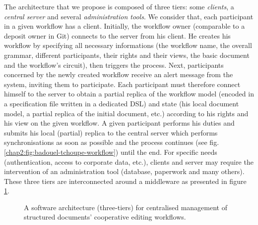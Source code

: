 \label{chap2:sec:archi-overall-operations}
The architecture that we propose is composed of three tiers: some \textit{clients}, a \textit{central server} and several \textit{administration tools}. We consider that, each participant in a given workflow has a client. Initially, the workflow owner (comparable to a deposit owner in Git) connects to the server from his client. He creates his workflow by specifying all necessary informations (the workflow name, the overall grammar, different participants, their rights and their views, the basic document and the workflow's circuit), then triggers the process. Next, participants concerned by the newly created workflow receive an alert message from the system, inviting them to participate. Each participant must therefore connect himself to the server to obtain a partial replica of the workflow model (encoded in a specification file written in a dedicated DSL) and state (his local document model, a partial replica of the initial document, etc.) according to his rights and his view on the given workflow. A given participant performs his duties and submits his local (partial) replica to the central server which performs synchronisations as soon as possible and the process continues (see fig. \ref{chap2:fig:badouel-tchoupe-workflow}) until the end.  For specific needs (authentication, access to corporate data, etc.), clients and server may require the intervention of an administration tool (database, paperwork and many others). These three tiers are interconnected around a middleware as presented in figure \ref{chap2:fig:architecture}.
\begin{figure}[ht!]
	\noindent
	\caption{A software architecture (three-tiers) for centralised management of structured documents' cooperative editing workflows.}
	\label{chap2:fig:architecture}
\end{figure}


